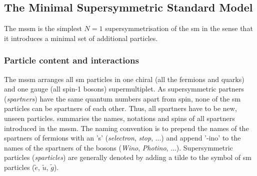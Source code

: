  
\subsection{The Minimal Supersymmetric Standard Model}

The \gls{mssm} is the simplest $N=1$ supersymmetrisation of the \gls{sm} in the sense that it introduces a minimal set of additional particles.

\subsubsection{Particle content and interactions}\label{sec:mssm_particle_content}

The \gls{mssm} arranges all \gls{sm} particles in one chiral (all the fermions and quarks) and one gauge (all spin-1 bosons) supermultiplet. As supersymmetric partners (\textit{spartners}) have the same quantum numbers apart from spin, none of the \gls{sm} particles can be spartners of each other. Thus, all spartners have to be new, unseen particles.  summaries the names, notations and spins of all spartners introduced in the \gls{mssm}. The naming convention is to prepend the names of the spartners of fermions with an 's' (\eg \textit{selectron}, \textit{stop}, ...) and append '-ino' to the names of the spartners of the bosons (\eg \textit{Wino}, \textit{Photino}, ...). Supersymmetric particles (\textit{sparticles}) are generally denoted by adding a tilde to the symbol of \gls{sm} particles (\eg $\tilde{e}$, $\tilde{u}$, $\tilde{g}$). 


